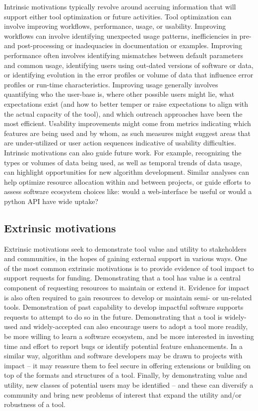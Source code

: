 \documentclass{article}
\begin{document}
Intrinsic motivations typically revolve around accruing information that will support either tool optimization or future activities. Tool optimization can involve improving workflows, performance, usage, or usability. Improving workflows can involve identifying unexpected usage patterns, inefficiencies in pre- and post-processing or inadequacies in documentation or examples. Improving performance often involves identifying mismatches between default parameters and common usage, identifying users using out-dated versions of software or data, or identifying evolution in the error profiles or volume of data that influence error profiles or run-time characteristics. Improving usage generally involves quantifying who the user-base is, where other possible users might lie, what expectations exist (and how to better temper or raise expectations to align with the actual capacity of the tool), and which outreach approaches have been the most efficient.  Usability improvements might come from metrics indicating which features are being used and by whom, as such measures might suggest areas that are under-utilized or user action sequences indicative of usability difficulties. 
Intrinsic motivations can also guide future work. For example, recognizing the types or volumes of data being used, as well as temporal trends of data usage, can highlight opportunities for new algorithm development. Similar analyses can help optimize resource allocation within and between projects, or guide efforts to assess software ecosystem choices like: would a web-interface be useful or would a python API have wide uptake? 

\subsection{Extrinsic motivations}
 
Extrinsic motivations seek to demonstrate tool value and utility to stakeholders and communities, in the hopes of gaining external support in various ways.  One of the most common extrinsic motivations is to provide evidence of tool impact to support requests for funding. Demonstrating that a tool has value is a central component of requesting resources to maintain or extend it.  Evidence for impact is also often required to gain resources to develop or maintain semi- or un-related tools. Demonstration of past capability to develop impactful software supports requests to attempt to do so in the future.  Demonstrating that a tool is widely-used and widely-accepted can also encourage users to adopt a tool more readily, be more willing to learn a software ecosystem, and be more interested in investing time and effort to report bugs or identify potential feature enhancements. In a similar way, algorithm and software developers may be drawn to projects with impact -- it may reassure them to feel secure in offering extensions or building on top of the formats and structures of a tool.  Finally, by demonstrating value and utility, new classes of potential users may be identified -- and these can diversify a community and bring new problems of interest that expand the utility and/or robustness of a tool.
\end{document}
